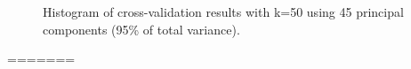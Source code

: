 \documentclass[paper=a4, fontsize=11pt]{scrartcl} %
\begin{document}
\begin{figure}[h]
    \centering
    \caption{Histogram of cross-validation results with k=50 using 45 principal components (95\% of total variance).}
    \label{fig:hist_m}
\end{figure}
=======


\end{document}
